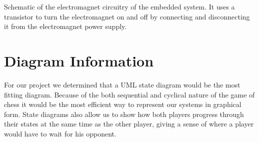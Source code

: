 \documentclass[12pt]{article}
\begin{document}
\begin{center}
Schematic of the electromagnet circuitry of the embedded system. It uses a transistor to turn the electromagnet on and off by connecting and disconnecting it from the electromagnet power supply.
\end{center}

\vspace*{5mm}

\section*{Diagram Information}
\indent

For our project we determined that a UML state diagram would be the most fitting diagram. Because of the both sequential and cyclical nature of the game of chess it would be the most efficient way to represent our systems in graphical form. State diagrams also allow us to show how both players progress through their states at the same time as the other player, giving a sense of where a player would have to wait for his opponent.
\end{document}

